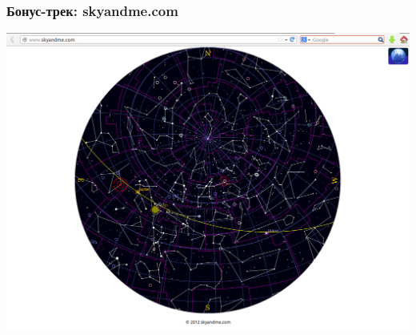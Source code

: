 \begin{frame}
  \frametitle{Бонус-трек: skyandme.com}

\includegraphics[width=1.0\textwidth]{skyandme-ss.png}

\end{frame}
